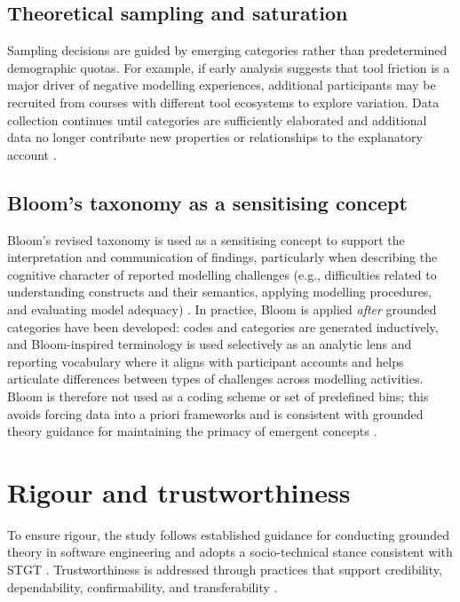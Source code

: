 \subsection{Theoretical sampling and saturation}
\label{subsec:method_sampling_saturation}

Sampling decisions are guided by emerging categories rather than predetermined demographic quotas. For example, if early analysis suggests that tool friction is a major driver of negative modelling experiences, additional participants may be recruited from courses with different tool ecosystems to explore variation. Data collection continues until categories are sufficiently elaborated and additional data no longer contribute new properties or relationships to the explanatory account \cite{adolph2011using,stol2016grounded}.

\subsection{Bloom's taxonomy as a sensitising concept}
\label{subsec:method_bloom_sensitising}

Bloom's revised taxonomy is used as a sensitising concept to support the interpretation and communication of findings, particularly when describing the cognitive character of reported modelling challenges (e.g., difficulties related to understanding constructs and their semantics, applying modelling procedures, and evaluating model adequacy) \cite{krathwohl2002revision}. In practice, Bloom is applied \emph{after} grounded categories have been developed: codes and categories are generated inductively, and Bloom-inspired terminology is used selectively as an analytic lens and reporting vocabulary where it aligns with participant accounts and helps articulate differences between types of challenges across modelling activities. Bloom is therefore not used as a coding scheme or set of predefined bins; this avoids forcing data into a priori frameworks and is consistent with grounded theory guidance for maintaining the primacy of emergent concepts \cite{stol2016grounded}.

\section{Rigour and trustworthiness}
\label{sec:method_rigour}

To ensure rigour, the study follows established guidance for conducting grounded theory in software engineering \cite{stol2016grounded} and adopts a socio-technical stance consistent with STGT \cite{hoda2018socio}. Trustworthiness is addressed through practices that support credibility, dependability, confirmability, and transferability \cite{hoda2018socio,stol2016grounded}.

